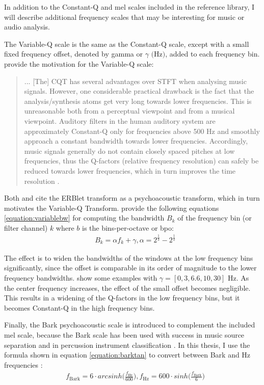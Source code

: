 \documentclass[report.tex]{subfiles}
\begin{document}
In addition to the Constant-Q and mel scales included in the reference library, I will describe additional frequency scales that may be interesting for music or audio analysis.

The Variable-Q scale \parencite{variableq1, variableq2} is the same as the Constant-Q scale, except with a small fixed frequency offset, denoted by gamma or $\gamma \text{ (Hz)}$, added to each frequency bin. \citeauthor{variableq1} provide the motivation for the Variable-Q scale:
\begin{quote}
	... [The] CQT has several advantages over STFT when analysing music signals. However, one considerable practical drawback is the fact that the analysis/synthesis atoms get very long towards lower frequencies. This is unreasonable both from a perceptual viewpoint and from a musical viewpoint. Auditory filters in the human auditory system are approximately Constant-Q only for frequencies above 500 Hz and smoothly approach a constant bandwidth towards lower frequencies. Accordingly, music signals generally do not contain closely spaced pitches at low frequencies, thus the Q-factors (relative frequency resolution) can safely be reduced towards lower frequencies, which in turn improves the time resolution \parencite[5]{variableq1}.
\end{quote}

Both \textcite{variableq1} and \textcite{variableq2} cite the ERBlet transform \parencite{erblet} as a psychoacoustic transform, which in turn motivates the Variable-Q Transform. \textcite{variableq1, variableq2} provide the following equations \eqref{equation:variablebw} for computing the bandwidth $B_{k}$ of the frequency bin (or filter channel) $k$ where $b$ is the bins-per-octave or bpo:
\begin{align}\tag{16}\label{equation:variablebw}
	\nonumber & B_{k} = \alpha f_{k} + \gamma, \alpha = 2^{\frac{1}{b}} - 2^{\frac{1}{b}}
\end{align}

The effect is to widen the bandwidths of the windows at the low frequency bins significantly, since the offset is comparable in its order of magnitude to the lower frequency bandwidths. \textcite{variableq1} show some examples with $\gamma = [0, 3, 6.6, 10, 30] \text{ Hz}$. As the center frequency increases, the effect of the small offset becomes negligible. This results in a widening of the Q-factors in the low frequency bins, but it becomes Constant-Q in the high frequency bins. 

Finally, the Bark psychoacoustic scale is introduced to complement the included mel scale, because the Bark scale has been used with success in music source separation \parencite{barkjust1} and in percussion instrument classification \parencite{barkjust2}. In this thesis, I use the formula shown in equation \eqref{equation:barktan} to convert between Bark and Hz frequencies \parencite{barktan}:
\begin{align}\tag{17}\label{equation:barktan}
	\nonumber & f_{\text{Bark}} = 6 \cdot arcsinh \Big(\frac{f_{\text{Hz}}}{600}\Big), f_{\text{Hz}} = 600 \cdot sinh \Big(\frac{f_{\text{Bark}}}{6}\Big)
\end{align}
\end{document}
